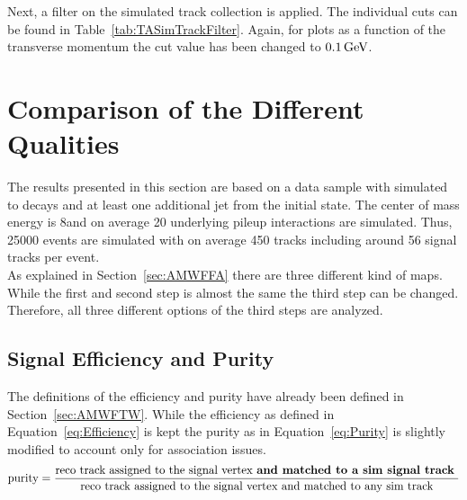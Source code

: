 

Next, a filter on the simulated track collection is applied. The individual cuts can be found in Table~\ref{tab:TASimTrackFilter}. Again, for plots as a function of the transverse momentum the cut value has been changed to $0.1\,\text{Ge\hspace{-.08em}V}$. \\



\section{Comparison of the Different Qualities \label{sec:TASEFRDQ}}

The results presented in this section are based on a data sample with simulated \Zz to \MM decays and at least one additional jet from the initial state. The center of mass energy is 8\TeV and on average 20 underlying pileup interactions are simulated. Thus, 25000 events are simulated with on average 450 tracks including around 56 signal tracks per event.\\
As explained in Section~\ref{sec:AMWFFA} there are three different kind of maps. While the first and second step is almost the same the third step can be changed. Therefore, all three different options of the third steps are analyzed. 

\subsection{Signal Efficiency and Purity \label{sec:TASEFR}}

The definitions of the efficiency and purity have already been defined in Section~\ref{sec:AMWFTW}. While the efficiency as defined in Equation~\ref{eq:Efficiency} is kept the purity as in Equation~\ref{eq:Purity} is slightly modified to account only for association issues. 
\begin{equation}
\textrm{purity} = \frac{ \textrm{reco track assigned to the signal vertex \textbf{and matched to a sim signal track} } }{ \textrm{reco track assigned to the signal vertex and matched to any sim track} }
\label{eq:AssPurity}
\end{equation}

